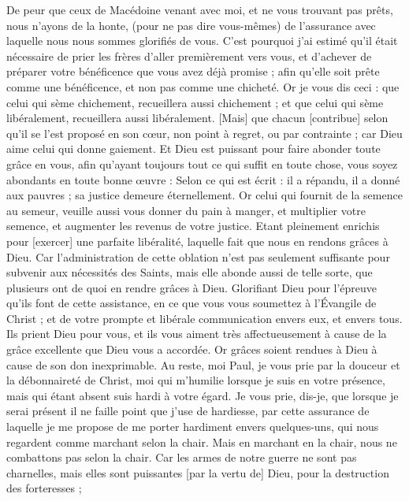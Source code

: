 \begin{multicols}{2}
De peur que ceux de Macédoine venant avec moi, et ne vous trouvant pas prêts, nous n'ayons de la honte, (pour ne pas dire vous-mêmes) de l'assurance avec laquelle nous nous sommes glorifiés de vous.
C'est pourquoi j'ai estimé qu'il était nécessaire de prier les frères d'aller premièrement vers vous, et d'achever de préparer votre bénéficence que vous avez déjà promise ; afin qu'elle soit prête comme une bénéficence, et non pas comme une chicheté.
Or je vous dis ceci : que celui qui sème chichement, recueillera aussi chichement ; et que celui qui sème libéralement, recueillera aussi libéralement.
[Mais] que chacun [contribue] selon qu'il se l'est proposé en son cœur, non point à regret, ou par contrainte ; car Dieu aime celui qui donne gaiement.
Et Dieu est puissant pour faire abonder toute grâce en vous, afin qu'ayant toujours tout ce qui suffit en toute chose, vous soyez abondants en toute bonne œuvre :
Selon ce qui est écrit : il a répandu, il a donné aux pauvres ; sa justice demeure éternellement.
Or celui qui fournit de la semence au semeur, veuille aussi vous donner du pain à manger, et multiplier votre semence, et augmenter les revenus de votre justice.
Etant pleinement enrichis pour [exercer] une parfaite libéralité, laquelle fait que nous en rendons grâces à Dieu.
Car l'administration de cette oblation n'est pas seulement suffisante pour subvenir aux nécessités des Saints, mais elle abonde aussi de telle sorte, que plusieurs ont de quoi en rendre grâces à Dieu.
Glorifiant Dieu pour l'épreuve qu'ils font de cette assistance, en ce que vous vous soumettez à l'Évangile de Christ ; et de votre prompte et libérale communication envers eux, et envers tous.
Ils prient Dieu pour vous, et ils vous aiment très affectueusement à cause de la grâce excellente que Dieu vous a accordée.
Or grâces soient rendues à Dieu à cause de son don inexprimable.
\VerseOne{}Au reste, moi Paul, je vous prie par la douceur et la débonnaireté de Christ, moi qui m'humilie lorsque je suis en votre présence, mais qui étant absent suis hardi à votre égard.
Je vous prie, dis-je, que lorsque je serai présent il ne faille point que j'use de hardiesse, par cette assurance de laquelle je me propose de me porter hardiment envers quelques-uns, qui nous regardent comme marchant selon la chair.
Mais en marchant en la chair, nous ne combattons pas selon la chair.
Car les armes de notre guerre ne sont pas charnelles, mais elles sont puissantes [par la vertu de] Dieu, pour la destruction des forteresses ;

\end{multicols}

